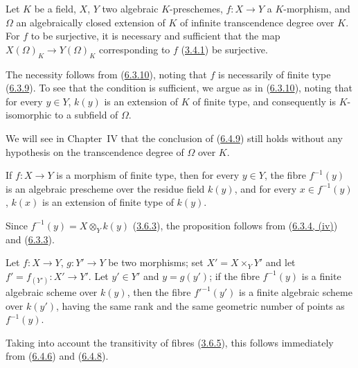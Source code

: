 \begin{proposition}[6.4.9]
\label{I.6.4.9}
Let $K$ be a field, $X$, $Y$ two algebraic $K$-preschemes, $f:X\to Y$ a
$K$-morphism, and $\Omega$ an algebraically closed extension of $K$ of
infinite transcendence degree over $K$. For $f$ to be surjective, it is
necessary and sufficient that the map $X(\Omega)_K\to Y(\Omega)_K$
corresponding to $f$ (\hyperref[I.3.4.1]{3.4.1}) be surjective.
\end{proposition}

The necessity follows from (\hyperref[I.6.3.10]{6.3.10}), noting that
$f$ is necessarily of finite type (\hyperref[I.6.3.9]{6.3.9}). To see
that the condition is sufficient, we argue as in
(\hyperref[I.6.3.10]{6.3.10}), noting that for every $y\in Y$,
$k(y)$ is an extension of $K$ of finite type, and consequently is
$K$-isomorphic to a subfield of $\Omega$.

\begin{remark}[6.4.10]
\label{I.6.4.10}
We will see in Chapter~IV that the conclusion of
(\hyperref[I.6.4.9]{6.4.9}) still holds without any hypothesis on the
transcendence degree of $\Omega$ over $K$.
\end{remark}

\begin{proposition}[6.4.11]
\label{I.6.4.11}
If $f:X\to Y$ is a morphism of finite type, then for every $y\in Y$, the fibre
$f^{-1}(y)$ is an algebraic prescheme over the residue field $k(y)$, and for
every $x\in f^{-1}(y)$, $k(x)$ is an extension of finite type of $k(y)$.
\end{proposition}

Since $f^{-1}(y)=X\otimes_Y k(y)$
(\hyperref[I.3.6.3]{3.6.3}), the proposition follows from
(\hyperref[I.6.3.4]{6.3.4, (iv)}) and
(\hyperref[I.6.3.3]{6.3.3}).

\begin{proposition}[6.4.12]
\label{I.6.4.12}
Let $f:X\to Y$, $g:Y'\to Y$ be two morphisms; set
$X'=X\times_Y Y'$ and let $f'=f_{(Y')}:X'\to Y'$. Let $y'\in Y'$ and
$y=g(y')$; if the fibre $f^{-1}(y)$ is a finite algebraic scheme over $k(y)$,
then the fibre $f'^{-1}(y')$ is a finite algebraic scheme over $k(y')$, having
the same rank and the same geometric number of points as $f^{-1}(y)$.
\end{proposition}

Taking into account the transitivity of fibres
(\hyperref[I.3.6.5]{3.6.5}), this follows immediately from
(\hyperref[I.6.4.6]{6.4.6}) and
(\hyperref[I.6.4.8]{6.4.8}).

